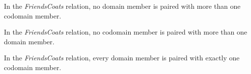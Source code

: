 \documentclass{ximera}
\begin{document}
\begin{exercise}
\begin{question} 
In the \textit{FriendsCoats} relation, no domain member is paired with more than one codomain member.

\begin{multipleChoice}
\end{multipleChoice}
\end{question}








\begin{question} 
In the \textit{FriendsCoats} relation, no codomain member is paired with more than one domain member.

\begin{multipleChoice}
\end{multipleChoice}
\end{question}








\begin{question} 
In the \textit{FriendsCoats} relation, every domain member is paired with exactly one codomain member.

\begin{multipleChoice}
\end{multipleChoice}
\end{question}







\end{exercise}
\end{document}
